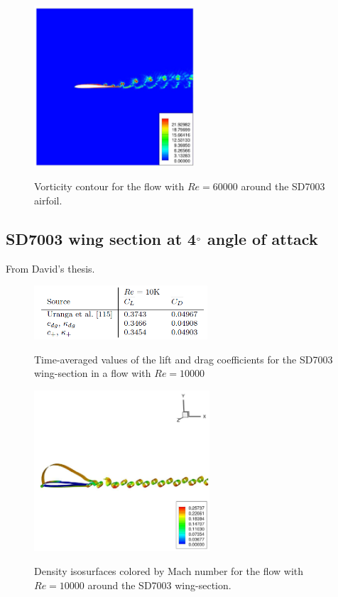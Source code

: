 \begin{figure}
\centering
\includegraphics[height=60mm]{figure_937b} \\
\caption{Vorticity contour for the flow with $Re = 60000$ around the SD7003 airfoil.}
\label{fig:figure_937b}
\end{figure}


\subsection{SD7003 wing section at 4$^{\circ}$ angle of attack}
From David's thesis.

\begin{figure}
\centering
\includegraphics[height=20mm]{table_927} \\
\caption{Time-averaged values of the lift and drag coefficients for the SD7003 wing-section in a flow with $Re = 10000$}
\label{fig:table_927}
\end{figure}

\begin{figure}
\centering
\includegraphics[height=60mm]{figure_939a} \\
\caption{Density isosurfaces colored by Mach number for the flow with $Re = 10000$ around the SD7003 wing-section.}
\label{fig:figure_939a}
\end{figure}

